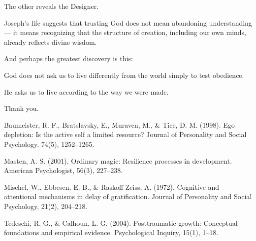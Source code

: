 \documentclass[12pt]{article}
\begin{document}
The other reveals the Designer.

Joseph’s life suggests that trusting God does not mean abandoning understanding — it means recognizing that the structure of creation, including our own minds, already reflects divine wisdom.

And perhaps the greatest discovery is this:

God does not ask us to live differently from the world simply to test obedience.

He asks us to live according to the way we were made.

Thank you.

\newpage{}

Baumeister, R. F., Bratslavsky, E., Muraven, M., & Tice, D. M. (1998). Ego depletion: Is the active self a limited resource? Journal of Personality and Social Psychology, 74(5), 1252–1265.

Masten, A. S. (2001). Ordinary magic: Resilience processes in development. American Psychologist, 56(3), 227–238.

Mischel, W., Ebbesen, E. B., & Raskoff Zeiss, A. (1972). Cognitive and attentional mechanisms in delay of gratification. Journal of Personality and Social Psychology, 21(2), 204–218.

Tedeschi, R. G., & Calhoun, L. G. (2004). Posttraumatic growth: Conceptual foundations and empirical evidence. Psychological Inquiry, 15(1), 1–18.
\end{document}
